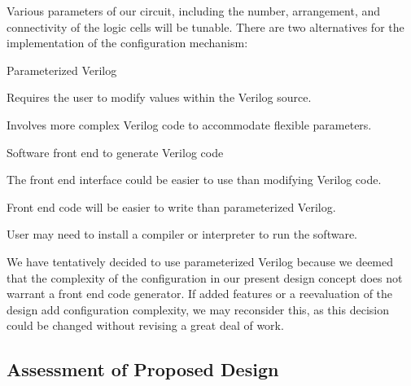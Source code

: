 Various parameters of our circuit, including the number, arrangement, and connectivity of the logic cells will be tunable.
There are two alternatives for the implementation of the configuration mechanism:
\begin{enumeration}
	\item Parameterized Verilog \
		\begin{itemlist}
			\item Requires the user to modify values within the Verilog source.
			\item Involves more complex Verilog code to accommodate flexible parameters.
		\end{itemlist}
	\item Software front end to generate Verilog code \
		\begin{itemlist}
			\item The front end interface could be easier to use than modifying Verilog code.
			\item Front end code will be easier to write than parameterized Verilog.
			\item User may need to install a compiler or interpreter to run the software.
		\end{itemlist}
\end{enumeration}

We have tentatively decided to use parameterized Verilog because we deemed that the complexity of the configuration in our present design concept does not warrant a front end code generator.
If added features or a reevaluation of the design add configuration complexity, we may reconsider this, as this decision could be changed without revising a great deal of work.



\subsection{Assessment of Proposed Design} %








